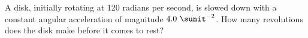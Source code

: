A disk, initially rotating at 120 radians per second, is slowed down with a
constant angular acceleration of magnitude $4.0\ \sunit^{-2}$. How many
revolutions does the disk make before it comes to rest?\answercheck
